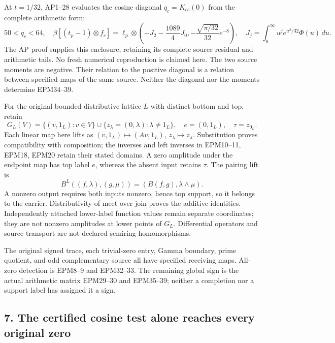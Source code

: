 \documentclass[
  10pt,
  a4paper,
]{article}
\begin{document}
At \(t=1/32\), AP1--28 evaluates the cosine diagonal \(q_c=K_{cc}(0)\)
from the complete arithmetic form: \[
50<q_c<64,\quad
\beta[(t_p-1)\otimes f_c]
=\ell_p\otimes\left(-J_2-\frac{1089}{4}J_0,
-\frac{\sqrt{\pi/32}}{32}e^{-8}\right),\quad
J_j=\int_0^\infty u^j e^{u^2/32}\Phi(u)\,du.
\tag{EPM40}
\] The AP proof supplies this enclosure, retaining its complete source
residual and arithmetic tails. No fresh numerical reproduction is
claimed here. The two source moments are negative. Their relation to the
positive diagonal is a relation between specified maps of the same
source. Neither the diagonal nor the moments determine EPM34--39.

For the original bounded distributive lattice \(L\) with distinct bottom
and top, retain \[
G_L(V)=\{(v,1_L):v\in V\}\cup\{z_\lambda=(0,\lambda):\lambda\ne1_L\},
\quad e=(0,1_L),\quad\tau=z_{0_L}.
\tag{EPM41}
\] Each linear map here lifts as \((v,1_L)\mapsto(Av,1_L)\),
\(z_\lambda\mapsto z_\lambda\). Substitution proves compatibility with
composition; the inverses and left inverses in EPM10--11, EPM18, EPM20
retain their stated domains. A zero amplitude under the endpoint map has
top label \(e\), whereas the absent input retains \(\tau\). The pairing
lift is \[
B^L((f,\lambda),(g,\mu))=(B(f,g),\lambda\wedge\mu).
\tag{EPM42}
\] A nonzero output requires both inputs nonzero, hence top support, so
it belongs to the carrier. Distributivity of meet over join proves the
additive identities. Independently attached lower-label function values
remain separate coordinates; they are not nonzero amplitudes at lower
points of \(G_L\). Differential operators and source transport are not
declared semiring homomorphisms.

The original signed trace, each trivial-zero entry, Gamma boundary,
prime quotient, and odd complementary source all have specified
receiving maps. All-zero detection is EPM8--9 and EPM32--33. The
remaining global sign is the actual arithmetic matrix EPM29--30 and
EPM35--39; neither a completion nor a support label has assigned it a
sign.

\subsection{7. The certified cosine test alone reaches every original
zero}\label{the-certified-cosine-test-alone-reaches-every-original-zero}
\end{document}
